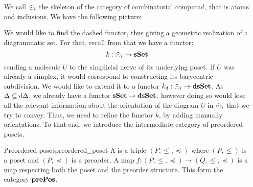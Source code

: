We call \( \eye_i \) the skeleton of the category of combinatorial computad, that is atoms and inclusions. We have the following picture:
\begin{center}
\end{center}
We would like to find the dashed functor, thus giving a geometric realization of a diagrammatic set. For that, recall from \cite{hadzihasanovic_diagrammatic_2020} that we have a functor:
\begin{equation*}
    k : \eye_i \to \sSet
\end{equation*} 
sending a molecule \( U \) to the simplicial nerve of its underlying poset. If \( U \) was already a simplex, it would correspond to constructing its barycentric subdivision. We would like to extend it to a functor \( k_d : \eye_i \to \dsSet \). As \( \Delta \subseteq \mathrm{d}\Delta \), we already have a functor \( \mathbf{sSet} \to \mathbf{dsSet} \), however doing so would lose all the relevant information about the orientation of the diagram \( U \) in \( \eye_i \) that we try to convey. Thus, we need to refine the functor \( k \), by adding manually orientations. To that end, we introduce the intermediate category of preordered posets.

\begin{cdef}{Preordered poset}{preordered_poset}
    A  is a triple \( (P, \le, \preceq) \) where \( (P, \le) \) is a poset and \( (P, \preceq) \) is a preorder. A map \( f :  (P, \le, \preceq) \to  (Q, \le, \preceq) \) is a map respecting both the poset and the preorder structure. This form the category \( \mathbf{prePos} \).
\end{cdef}

